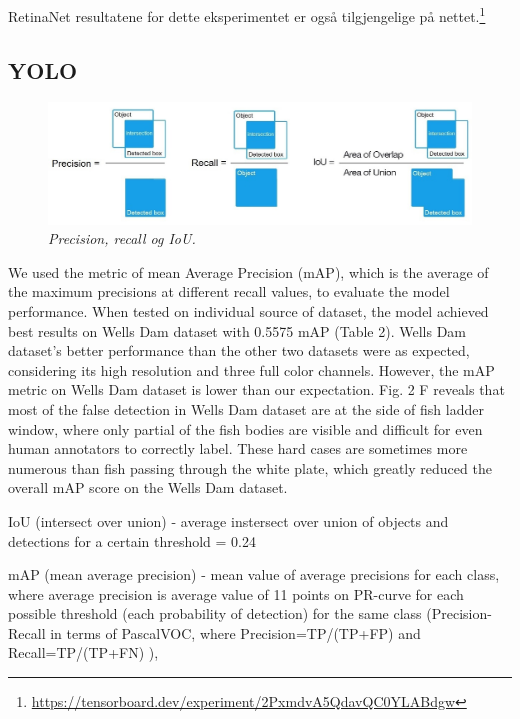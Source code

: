 RetinaNet resultatene for dette eksperimentet er også tilgjengelige på nettet.\footnote{\url{https://tensorboard.dev/experiment/2PxmdvA5QdavQC0YLABdgw}}

\subsection{YOLO}

\begin{figure}[h!]
\begin{center} 
\includegraphics[scale=0.45]{figures/precision}
\caption{\small \sl Precision, recall og IoU. \cite{Bochkovskiy 2020} \label{fig:precision}}
\end{center}
\end{figure}

We used the metric of mean Average Precision (mAP), which is the average of the maximum precisions at different recall values, to evaluate the model performance. When tested on individual source of dataset, the model achieved best results on Wells Dam dataset with 0.5575 mAP (Table 2). Wells Dam dataset’s better performance than the other two datasets were as expected, considering its high resolution and three full color channels. However, the mAP metric on Wells Dam dataset is lower than our expectation. Fig. 2 F reveals that most of the false detection in Wells Dam dataset are at the side of fish ladder window, where only partial of the fish bodies are visible and difficult for even human annotators to correctly label. These hard cases are sometimes more numerous than fish passing through the white plate, which greatly reduced the overall mAP score on the Wells Dam dataset. \cite{Xu og Matzner 2018}

IoU (intersect over union) - average instersect over union of objects and detections for a certain threshold = 0.24

mAP (mean average precision) - mean value of average precisions for each class, where average precision is average value of 11 points on PR-curve for each possible threshold (each probability of detection) for the same class (Precision-Recall in terms of PascalVOC, where Precision=TP/(TP+FP) and Recall=TP/(TP+FN) ), %

